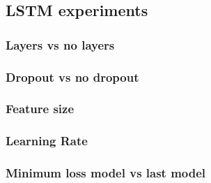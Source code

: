 \subsection{LSTM experiments}

\subsubsection{Layers vs no layers}


\subsubsection{Dropout vs no dropout}


\subsubsection{Feature size}


\subsubsection{Learning Rate}


\subsubsection{Minimum loss model vs last model} %
%

